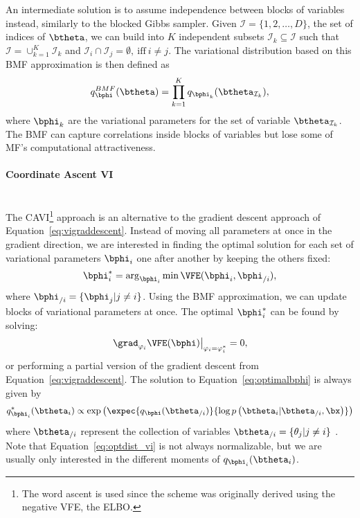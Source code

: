 An intermediate solution is to assume independence between blocks of variables instead, similarly to the blocked Gibbs sampler.
Given $\mathcal{I}=\{1,2,\ldots,D\}$, the set of indices of $\btheta$, we can build into $K$ independent subsets $\mathcal{I}_k \subseteq \mathcal{I}$ such that  $\mathcal{I} = \cup_{k=1}^K \mathcal{I}_{k}$ and $\mathcal{I}_i \cap \mathcal{I}_j=\emptyset,~\mathrm{iff}~i \neq j$.
The variational distribution based on this \ac{BMF} approximation is then defined as
\begin{align}
    q^{BMF}_{\bphi}(\btheta) = \prod_{k=1}^K q_{\bphi_k}(\btheta_{\mathcal{I}_k}),
\end{align}
where $\bphi_k$ are the variational parameters for the set of variable $\btheta_{\mathcal{I}_k}$.
The \ac{BMF} can capture correlations inside blocks of variables but lose some of \ac{MF}'s computational attractiveness.

\paragraph{Coordinate Ascent VI}\mbox{}\\
\label{sec:cavi}
The \ac{CAVI}\footnote{The word ascent is used since the scheme was originally derived using the negative \ac{VFE}, the \ac{ELBO}.} approach is an alternative to the gradient descent approach of Equation~\ref{eq:vigraddescent}.
Instead of moving all parameters at once in the gradient direction, we are interested in finding the optimal solution for each set of variational parameters $\bphi_i$ one after another by keeping the others fixed:
\begin{align}
    \bphi_i^* = \arg_{\bphi_i}\min \VFE(\bphi_i, \bphi_{/i}),
    \label{eq:optimalbphi}
\end{align}
where $\bphi_{/i} = \{\bphi_j | j \neq i\}$.
Using the \ac{BMF} approximation, we can update blocks of variational parameters at once.
The optimal $\bphi_i^*$ can be found by solving:
\begin{align}
\left.\grad_{\varphi_i}\VFE(\bphi)\right\vert_{\varphi_i=\varphi_i^*} = 0,
\end{align}
or performing a partial version of the gradient descent from Equation~\eqref{eq:vigraddescent}.
The solution to Equation~\eqref{eq:optimalbphi} is always given by
\begin{align}
q_{\bphi_i}^*(\btheta_i) \propto \exp\left(\expec{q_{\bphi}(\btheta_{/i})}{\log p\left(\btheta_i|\btheta_{/i},\bx\right)}\right)\label{eq:optdist_vi}
\end{align}
where $\btheta_{/i}$ represent the collection of variables $\btheta_{/i} = \{\theta_j | j \neq i\}$ \cite{murphyMachineLearningProbabilistic2012}.
Note that Equation~\ref{eq:optdist_vi} is not always normalizable, but we are usually only interested in the different moments of $q_{\bphi_i}(\btheta_i)$.

